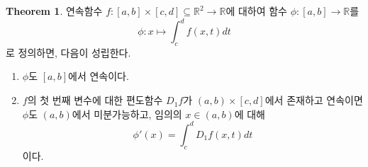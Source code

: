 \documentclass[11pt]{book}
\numberwithin{equation}{chapter}
\def\RR{\mathbb{R}}
\theoremstyle{definition}
\newtheorem{thm}{Theorem}[section]
\newenvironment{enum}
	{\begin{enumerate}[label=(\alph*), leftmargin=2\parindent]}
	{\end{enumerate}}
\begin{document}
\begin{thm} \label{14.1.1}
    연속함수 \(f : [a, b] \times [c, d] \subseteq \RR^2 \to \RR\)에 대하여 함수 \(\phi : [a, b] \to \RR\)를
    \begin{equation} \label{eq14.1}
        \phi : x \mapsto \int_c^d f(x, t) dt   
    \end{equation}
    로 정의하면, 다음이 성립한다.
    \begin{enum}
        \item \(\phi\)도 \([a, b]\)에서 연속이다.
        \item \(f\)의 첫 번째 변수에 대한 편도함수 \(D_1f\)가 \((a, b)\times [c, d]\)에서 존재하고 연속이면 \(\phi\)도 \((a, b)\)에서 미분가능하고, 임의의 \(x \in (a, b)\)에 대해
        \begin{equation} \label{eq14.2}
            \phi'(x) = \int_c^d D_1f(x, t)dt 
        \end{equation}
        이다.
    \end{enum}
\end{thm}
\end{document}
